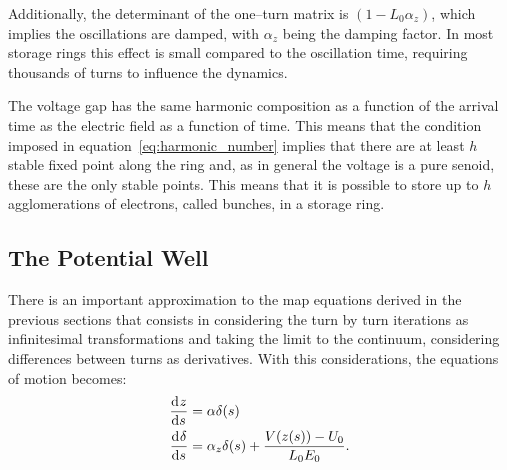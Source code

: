 	Additionally, the determinant of the one--turn matrix is $(1-L_0\alpha_z)$, which implies the oscillations are damped, with $\alpha_z$ being the damping factor. In most storage rings this effect is small compared to the oscillation time, requiring thousands of turns to influence the dynamics.

	The voltage gap has the same harmonic composition as a function of the arrival time as the electric field as a function of time. This means that the condition imposed in equation~\eqref{eq:harmonic_number} implies that there are at least $h$ stable fixed point along the ring and, as in general the voltage is a pure senoid, these are the only stable points. This means that it is possible to store up to $h$ agglomerations of electrons, called bunches, in a storage ring.

\subsection{The Potential Well}\label{ssec:potential_well}

	There is an important approximation to the map equations derived in the previous sections that consists in considering the turn by turn iterations as infinitesimal transformations and taking the limit to the continuum, considering differences between turns as derivatives. With this considerations, the equations of motion becomes:
	\begin{align}
		\frac{\mathrm{d}^{{}}z}{\mathrm{d} s^{{}}} &= \alpha \delta(s) \\\nonumber
		\frac{\mathrm{d}^{{}}\delta}{\mathrm{d} s^{{}}} &= \alpha_z\delta(s) + \frac{V(z(s))-U_0}{L_0E_0}.
	\end{align}

